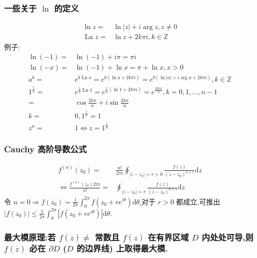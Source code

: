 \subsubsection{一些关于 $\ln$ 的定义}
\begin{align}
    \ln z=&\ln |z|+i\arg z,z\ne 0\nonumber\\
    \operatorname{Ln} z=&\ln z+2k\pi i,k\in \mathbb{Z}\nonumber
\end{align}
例子:
\begin{align}
    \ln \left( -1 \right) =&\ln\left( -1 \right) +i\pi =\pi i\nonumber\\
    \ln \left( -x \right) =&\ln\left( -1 \right) +\ln x=\pi +\ln x,x>0\nonumber\\
    a^{b}=&e^{b\operatorname{Ln} a}=e^{b\left( \ln a+2k\pi i \right) }=e^{b\left( \ln |a|+i\arg a+2k\pi i \right) },k\in \mathbb {Z}\nonumber\\
    1^{\frac{1}{n}}=&e^{\frac{1}{n}\operatorname{Ln} 1}=e^{\frac{1}{n}\left( \ln 1+2k\pi i \right) }=e^{\frac{2k\pi i}{n}},k=0,1,\ldots,n-1\nonumber\\
    =&\cos \frac{2k\pi}{n}+i\sin \frac{2k\pi }{n}\nonumber\\
    k=&0,1^{\frac{1}{n}}=1\nonumber\\
    z^{n}=&1\Leftrightarrow z=1^{\frac{1}{n}}\nonumber
\end{align}
\subsubsection{Cauchy 高阶导数公式}
\begin{align}
    f ^{\left( n \right) }\left( z_0 \right) =&\frac{n!}{2\pi i}\oint_{|z-z_0|=r>0}^{}\frac{f\left( z \right) }{\left( z-z_0 \right) ^{n+1}}\mathrm{d}z\nonumber\\
    \Leftrightarrow \frac{f ^{\left( n \right) }\left( z_0 \right) 2\pi i}{n!}=&\oint_{|z-z_0|=r}^{}\frac{f\left( z \right) }{\left( z-z_0 \right) ^{n+1}}\mathrm{d}z\nonumber
\end{align}
令 $n= 0\Rightarrow f\left( z_0 \right) =\frac{1}{2\pi}\int_{0}^{2\pi}f\left( z_0+re^{i \theta} \right) \mathrm{d}\theta$,对于 $r>0$ 都成立,可推出 $|f\left( z_0 \right) |\le \frac{1}{2\pi}\int_{0}^{2\pi}|f\left( z_0+re^{i \theta} \right) |\mathrm{d}\theta$.
\subsubsection{最大模原理:若 $f\left( z \right) \ne $ 常数且 $f\left( z \right) $ 在有界区域 $D$ 内处处可导,则 $f\left( z \right) $ 必在 $\partial D$ ($D$ 的边界线) 上取得最大模.}

